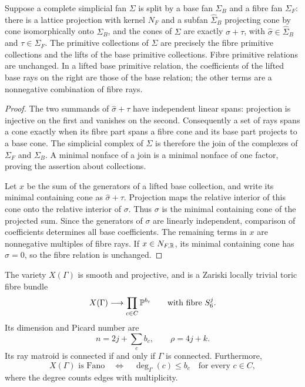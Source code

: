 \begin{lemma}\label{graph:split-collections}
Suppose a complete simplicial fan $\Sigma$ is split by a base fan
$\Sigma_B$ and a fibre fan $\Sigma_F$: there is a lattice projection with
kernel $N_F$ and a subfan $\widehat\Sigma_B$ projecting cone by cone
isomorphically onto $\Sigma_B$, and the cones of $\Sigma$ are exactly
$\widehat\sigma+\tau$, with $\widehat\sigma\in\widehat\Sigma_B$ and
$\tau\in\Sigma_F$.  The primitive collections of $\Sigma$ are precisely
the fibre primitive collections and the lifts of the base primitive
collections.  Fibre primitive relations are unchanged.  In a lifted
base primitive relation, the coefficients of the lifted base rays on
the right are those of the base relation; the other terms are a
nonnegative combination of fibre rays.
\end{lemma}

\begin{proof}
The two summands of $\widehat\sigma+\tau$ have independent linear spans:
projection is injective on the first and vanishes on the second.
Consequently a set of rays spans a cone exactly when its fibre part
spans a fibre cone and its base part projects to a base cone.  The
simplicial complex of $\Sigma$ is therefore the join of the complexes of
$\Sigma_F$ and $\Sigma_B$.  A minimal nonface of a join is a minimal
nonface of one factor, proving the assertion about collections.

Let $x$ be the sum of the generators of a lifted base collection, and
write its minimal containing cone as $\widehat\sigma+\tau$.  Projection
maps the relative interior of this cone onto the relative interior of
$\sigma$.  Thus $\sigma$ is the minimal containing cone of the projected
sum. Since the generators of $\sigma$ are linearly independent,
comparison of coefficients determines all base coefficients. The
remaining terms in $x$ are nonnegative multiples of fibre rays.
If $x\in N_{F,\mathbb{R}}$,
its minimal containing cone has $\widehat\sigma=0$, so the fibre relation
is unchanged.
\end{proof}

\begin{proposition}\label{graph:geometry}
The variety $X(\Gamma)$ is smooth and projective, and is a Zariski locally
trivial toric fibre bundle
\[
 X(\Gamma)\longrightarrow\prod_{c\in C}\mathbb{P}^{b_c}
 \qquad\text{with fibre }S_6^j.
\]
Its dimension and Picard number are
\begin{equation}\label{graph:dimension-rank}
 n=2j+\sum_c b_c,\qquad \rho=4j+k.
\end{equation}
Its ray matroid is connected if and only if $\Gamma$ is connected.
Furthermore,
\begin{equation}\label{graph:fano-condition}
 X(\Gamma)\text{ is Fano}\quad\Longleftrightarrow\quad
 \deg_\Gamma(c)\le b_c\quad\text{for every }c\in C,
\end{equation}
where the degree counts edges with multiplicity.
\end{proposition}

